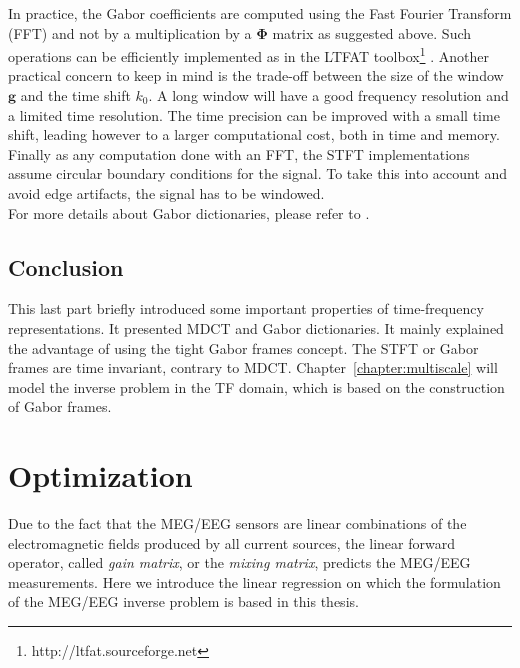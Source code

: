 In practice, the Gabor coefficients are computed using the Fast Fourier Transform (FFT) and not by a multiplication by a $\mathbf{\Phi}$ matrix as suggested above. Such operations can be efficiently implemented as in the LTFAT toolbox\footnote{http://ltfat.sourceforge.net} \cite{sondergaard2012linear}. Another practical concern to keep in mind is the trade-off between the size of the window $\mathbf{g}$ and the time shift $k_0$. A long window will have a good frequency resolution and a limited time resolution. The time precision can be improved with a small time shift, leading however to a larger computational cost, both in time and memory. Finally as any computation done with an FFT, the STFT implementations assume circular boundary conditions for the signal. To take this into account and avoid edge artifacts, the signal has to be windowed.\\

For more details about Gabor dictionaries, please refer to \cite{daubechies1992ten}.

\subsection{Conclusion}

This last part briefly introduced some important properties of time-frequency representations. It presented MDCT and Gabor dictionaries. It mainly explained the advantage of using the tight Gabor frames concept. The STFT or Gabor frames are time invariant, contrary to MDCT. Chapter~\ref{chapter:multiscale} will model the inverse problem in the \ac{TF} domain, which is based on the construction of Gabor frames. 

\section{Optimization}
Due to the fact that the MEG/EEG sensors are linear combinations of the electromagnetic fields produced by all current sources, the linear forward operator, called \textit{gain matrix}, or the \textit{mixing matrix}, predicts the MEG/EEG measurements. Here we introduce the linear regression on which the formulation of the MEG/EEG inverse problem is based in this thesis.

